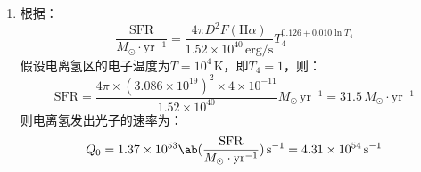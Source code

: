 \documentclass[a4paper,fontset=none]{ctexart}
\begin{document}
\begin{enumerate}
    \bigskip
    \item[42.2]
    根据：
    \[
        \frac{\mathrm{SFR}}{M_\odot \cdot \mathrm{yr^{-1}}} = \frac{4\pi D^2 F(\mathrm{H}\alpha)}{1.52 \times 10^{40}\,\mathrm{erg/s}} T_4^{0.126+0.010\ln{T_4}}
    \]
    假设电离氢区的电子温度为$T = 10^4\,\mathrm{K}$，即$T_4 = 1$，则：
    \[
        \mathrm{SFR} = \frac{4\pi \times (3.086 \times 10^{19})^2 \times 4 \times 10^{-11}}{1.52 \times 10^{40}} M_\odot\,\mathrm{yr^{-1}} = 31.5\,M_\odot \cdot \mathrm{yr^{-1}}
    \]
    则电离氢发出光子的速率为：
    \[
        Q_0 = 1.37 \times 10^{53} \ab(\frac{\mathrm{SFR}}{M_\odot \cdot \mathrm{yr^{-1}}})\,\mathrm{s^{-1}} = 4.31 \times 10^{54}\,\mathrm{s^{-1}}
    \]

\end{enumerate}
\end{document}
